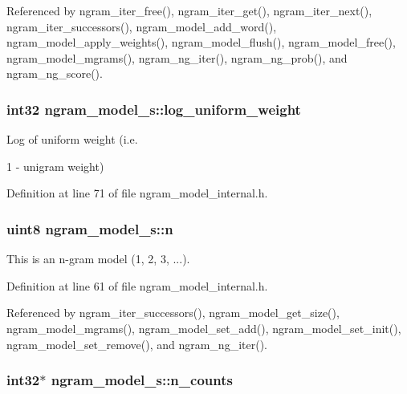Referenced by ngram\+\_\+iter\+\_\+free(), ngram\+\_\+iter\+\_\+get(), ngram\+\_\+iter\+\_\+next(), ngram\+\_\+iter\+\_\+successors(), ngram\+\_\+model\+\_\+add\+\_\+word(), ngram\+\_\+model\+\_\+apply\+\_\+weights(), ngram\+\_\+model\+\_\+flush(), ngram\+\_\+model\+\_\+free(), ngram\+\_\+model\+\_\+mgrams(), ngram\+\_\+ng\+\_\+iter(), ngram\+\_\+ng\+\_\+prob(), and ngram\+\_\+ng\+\_\+score().

\subsubsection[{log\+\_\+uniform\+\_\+weight}]{\setlength{\rightskip}{0pt plus 5cm}int32 ngram\+\_\+model\+\_\+s\+::log\+\_\+uniform\+\_\+weight}\label{structngram__model__s_aa38c5fdecaefd9a2f43b69f26ae492c1}


Log of uniform weight (i.\+e. 

1 -\/ unigram weight) 

Definition at line 71 of file ngram\+\_\+model\+\_\+internal.\+h.

\subsubsection[{n}]{\setlength{\rightskip}{0pt plus 5cm}uint8 ngram\+\_\+model\+\_\+s\+::n}\label{structngram__model__s_a3c87bc1b678662a2c8930b3b8c33a80f}


This is an n-\/gram model (1, 2, 3, ...). 



Definition at line 61 of file ngram\+\_\+model\+\_\+internal.\+h.



Referenced by ngram\+\_\+iter\+\_\+successors(), ngram\+\_\+model\+\_\+get\+\_\+size(), ngram\+\_\+model\+\_\+mgrams(), ngram\+\_\+model\+\_\+set\+\_\+add(), ngram\+\_\+model\+\_\+set\+\_\+init(), ngram\+\_\+model\+\_\+set\+\_\+remove(), and ngram\+\_\+ng\+\_\+iter().

\subsubsection[{n\+\_\+counts}]{\setlength{\rightskip}{0pt plus 5cm}int32$\ast$ ngram\+\_\+model\+\_\+s\+::n\+\_\+counts}\label{structngram__model__s_a9dcba9b49cc1cd189b257e5838da0eee}



